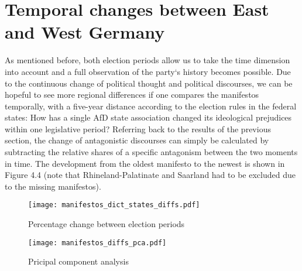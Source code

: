 \documentclass[a4paper]{scrreprt}
\begin{document}
\section{Temporal changes between East and West Germany}
As mentioned before, both election periods allow us to take the time dimension into account and a full observation of the party‘s history becomes possible. Due to the continuous change of political thought and political discourses, we can be hopeful to see more regional differences if one compares the manifestos temporally, with a five-year distance according to the election rules in the federal states: How has a single AfD state association changed its ideological prejudices within one legislative period? Referring back to the results of the previous section, the change of antagonistic discourses can simply be calculated by subtracting the relative shares of a specific antagonism between the two moments in time. The development from the oldest manifesto to the newest is shown in Figure 4.4 (note that Rhineland-Palatinate and Saarland had to be excluded due to the missing manifestos).\par
\begin{figure}[ht]
    \centering
    \texttt{[image: manifestos\_dict\_states\_diffs.pdf]}
    \caption{Percentage change between election periods}
    \label{fig:fig5}
\end{figure}
\begin{figure}[ht]
    \centering
    \texttt{[image: manifestos\_diffs\_pca.pdf]}
    \caption{Pricipal component analysis}
    \label{fig:fig6}
\end{figure}
\end{document}
